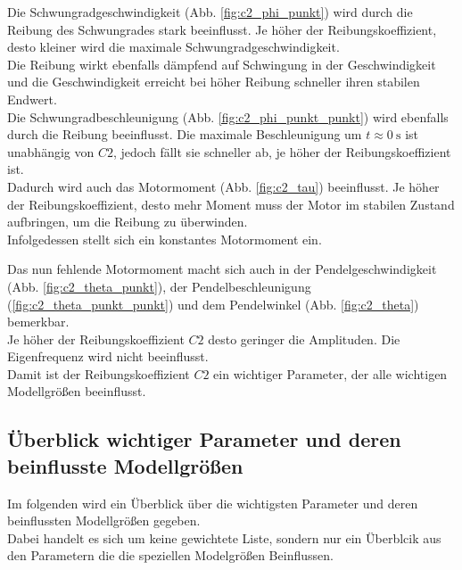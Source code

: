 Die Schwungradgeschwindigkeit (Abb. \ref{fig:c2_phi_punkt}) wird durch die Reibung des Schwungrades stark beeinflusst. Je höher der Reibungskoeffizient, desto kleiner wird die maximale Schwungradgeschwindigkeit.\\
Die Reibung wirkt ebenfalls dämpfend auf Schwingung in der Geschwindigkeit und die Geschwindigkeit erreicht bei höher Reibung schneller ihren stabilen Endwert.\\

Die Schwungradbeschleunigung (Abb. \ref{fig:c2_phi_punkt_punkt}) wird ebenfalls durch die Reibung beeinflusst. Die maximale Beschleunigung um $t\approx\SI{0}{\s}$ ist unabhängig von $C2$, jedoch fällt sie schneller ab, je höher der Reibungskoeffizient ist.\\

Dadurch wird auch das Motormoment (Abb. \ref{fig:c2_tau}) beeinflusst. Je höher der Reibungskoeffizient, desto mehr Moment muss der Motor im stabilen Zustand aufbringen, um die Reibung zu überwinden.\\
Infolgedessen stellt sich ein konstantes Motormoment ein.

Das nun fehlende Motormoment macht sich auch in der Pendelgeschwindigkeit (Abb. \ref{fig:c2_theta_punkt}), der Pendelbeschleunigung (\ref{fig:c2_theta_punkt_punkt}) und dem Pendelwinkel (Abb. \ref{fig:c2_theta}) bemerkbar.\\
Je höher der Reibungskoeffizient $C2$ desto geringer die Amplituden.
Die Eigenfrequenz wird nicht beeinflusst.\\

Damit ist der Reibungskoeffizient $C2$ ein wichtiger Parameter, der alle wichtigen Modellgrößen beeinflusst.
\pagebreak
\subsection*{Überblick wichtiger Parameter und deren beinflusste Modellgrößen}
Im folgenden wird ein Überblick über die wichtigsten Parameter und deren beinflussten Modellgrößen gegeben.\\
Dabei handelt es sich um keine gewichtete Liste, sondern nur ein Überblcik aus den Parametern die die speziellen Modelgrößen Beinflussen.


